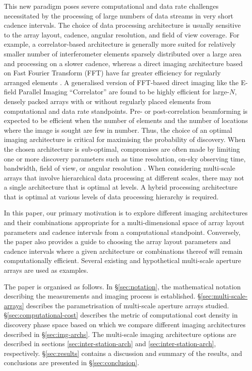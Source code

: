 \documentclass[
  journal=pasa,
  manuscript=article-type,
  year=2020,
  volume=37,
]{cup-journal}
\begin{document}
This new paradigm poses severe computational and data rate challenges necessitated by the processing of large numbers of data streams in very short cadence intervals. The choice of data processing architecture is usually sensitive to the array layout, cadence, angular resolution, and field of view coverage. For example, a correlator-based architecture is generally more suited for relatively smaller number of interferometer elements sparsely distributed over a large area and processing on a slower cadence, whereas a direct imaging architecture based on Fast Fourier Transform (FFT) have far greater efficiency for regularly arranged elements \citep{Daishido+1991,Otobe+1994,Tegmark+2009,Tegmark+2010,Foster+2014,Masui+2019}. A generalised version of FFT-based direct imaging like the E-field Parallel Imaging ``Correlator'' \citep[EPIC;][]{Thyagarajan+2017,Thyagarajan+2019,Krishnan+2023} are found to be highly efficient for large-$N$, densely packed arrays with or without regularly placed elements from computational and data rate standpoints. Pre- or post-correlation beamforming is expected to be efficient when the number of elements and the number of locations where the image is sought are few in number. Thus, the choice of an optimal imaging architecture is critical for maximising the probability of discovery. When the chosen architecture is sub-optimal, compromises are often made by limiting one or more discovery parameters such as time resolution, on-sky observing time, bandwidth, field of view, or angular resolution \citep[for example,][]{Price2024}. When considering multi-scale arrays that involve hierarchical data processing at different scales, there may not a single architecture that is optimal at levels. A hybrid processing architecture that is optimal at various levels of data processing hierarchy is required. 

In this paper, our primary motivation is to explore different imaging architectures and their combinations appropriate for a multi-dimensional space of array layout parameters and cadence intervals from a computational standpoint. Conversely, the paper also provides a guide to choosing the array layout parameters and cadence intervals where a given architecture or combinations thereof will remain computationally efficient. Several existing and hypothetical multi-scale aperture arrays are used as examples. 

The paper is organised as follows. In \S\ref{sec:notation}, the mathematical notation describing the measurements and imaging process is established. \S\ref{sec:multi-scale-arrays} describes the parametrisation of multi-scale aperture arrays studied. \S\ref{sec:computational-cost} describes the metric of computational cost density in discovery phase space based on which we compare different imaging architectures described in \S\ref{sec:img-archs}. The multi-scale imaging architecture options are described in sections \ref{sec:inter-station-arch} and \ref{sec:inter-station-arch}, respectively. \S\ref{sec:results} contains a discussion and summary of the results, and conclusions are presented in \S\ref{sec:conclusion}. 
\end{document}
